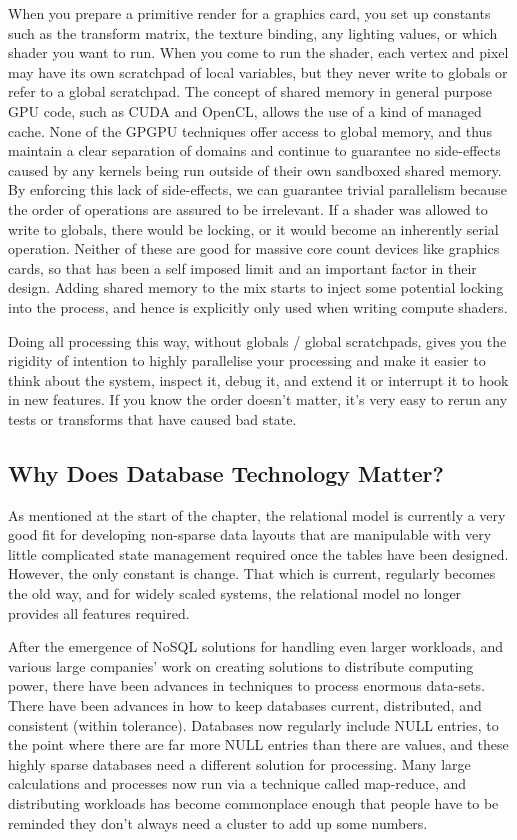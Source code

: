\documentclass[a4paper,12pt]{article}
\begin{document}
When you prepare a primitive render for a graphics card, you set up constants such as the transform matrix, the texture binding, any lighting values, or which shader you want to run. When you come to run the shader, each vertex and pixel may have its own scratchpad of local variables, but they never write to globals or refer to a global scratchpad. The concept of shared memory in general purpose GPU code, such as CUDA and OpenCL, allows the use of a kind of managed cache. None of the GPGPU techniques offer access to global memory, and thus maintain a clear separation of domains and continue to guarantee no side-effects caused by any kernels being run outside of their own sandboxed shared memory. By enforcing this lack of side-effects, we can guarantee trivial parallelism because the order of operations are assured to be irrelevant. If a shader was allowed to write to globals, there would be locking, or it would become an inherently serial operation. Neither of these are good for massive core count devices like graphics cards, so that has been a self imposed limit and an important factor in their design. Adding shared memory to the mix starts to inject some potential locking into the process, and hence is explicitly only used when writing compute shaders.

Doing all processing this way, without globals / global scratchpads, gives you the rigidity of intention to highly parallelise your processing and make it easier to think about the system, inspect it, debug it, and extend it or interrupt it to hook in new features. If you know the order doesn't matter, it's very easy to rerun any tests or transforms that have caused bad state.

\subsection{Why Does Database Technology Matter?}

As mentioned at the start of the chapter, the relational model is currently a very good fit for developing non-sparse data layouts that are manipulable with very little complicated state management required once the tables have been designed. However, the only constant is change. That which is current, regularly becomes the old way, and for widely scaled systems, the relational model no longer provides all features required.

After the emergence of NoSQL solutions for handling even larger workloads, and various large companies' work on creating solutions to distribute computing power, there have been advances in techniques to process enormous data-sets. There have been advances in how to keep databases current, distributed, and consistent (within tolerance). Databases now regularly include NULL entries, to the point where there are far more NULL entries than there are values, and these highly sparse databases need a different solution for processing. Many large calculations and processes now run via a technique called map-reduce, and distributing workloads has become commonplace enough that people have to be reminded they don't always need a cluster to add up some numbers.
\end{document}
